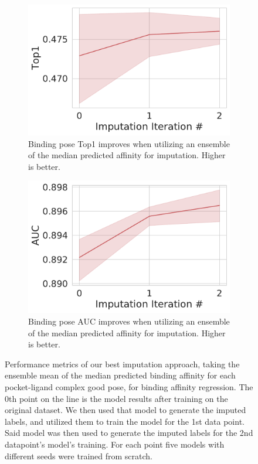 \documentclass[journal=jmcmar,manuscript=article]{achemso}
\begin{document}
\begin{figure}[tbph]
    \begin{subfigure}[t]{0.48\textwidth}
        \centering
        \includegraphics[width=\linewidth]{figures/MedGOEnsTop1.pdf}
        \caption{Binding pose Top1 improves when utilizing an ensemble of the median predicted affinity for imputation. Higher is better.}
    \end{subfigure}
    \hfill
    \begin{subfigure}[t]{0.48\textwidth}
        \centering
        \includegraphics[width=\linewidth]{figures/MedGOEnsAUC.pdf}
        \caption{Binding pose AUC improves when utilizing an ensemble of the median predicted affinity for imputation. Higher is better.}
    \end{subfigure}
    \caption{Performance metrics of our best imputation approach, taking the ensemble mean of the median predicted binding affinity for each pocket-ligand complex good pose, for binding affinity regression. The 0th point on the line is the model results after training on the original dataset. We then used that model to generate the imputed labels, and utilized them to train the model for the 1st data point. Said model was then used to generate the imputed labels for the 2nd datapoint's model's training. For each point five models with different seeds were trained from scratch.}
    \label{fig:medGOEnsOverall}
\end{figure}
\end{document}
